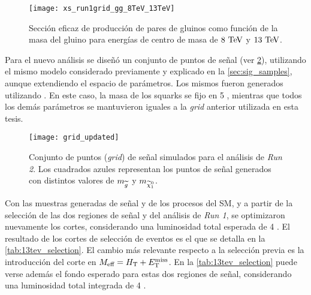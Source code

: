 \begin{figure}[!htb]
  \centering

  \texttt{[image: xs\_run1grid\_gg\_8TeV\_13TeV]}

  \caption{Sección eficaz de producción de pares de gluinos como función de la
    masa del gluino para energías de centro de masa de $8 \tev$ y
    $13 \tev$.}
  \label{fig:13tev_xs}

\end{figure}


Para el nuevo análisis se dise\~nó un conjunto de puntos de se\~nal (ver
\cref{fig:13tev_grid}), utilizando el mismo modelo considerado previamente y
explicado en la \cref{sec:sig_samples}, aunque extendiendo el espacio de
parámetros. Los mismos fueron generados utilizando
{\herwigpp}. En este caso, la masa de los squarks se fijo en 5 \tev, mientras
que todos los demás parámetros se mantuvieron iguales a la \emph{grid} anterior
utilizada en esta tesis.


\begin{figure}[!htb]
  \centering

  \texttt{[image: grid\_updated]}

  \caption{Conjunto de puntos (\emph{grid}) de señal simulados para el análisis
    de \emph{Run 2}. Los cuadrados azules representan los puntos de señal
    generados con distintos valores de $m_{\widetilde{g}}$ y $m_{\ninoone}$.}

  \label{fig:13tev_grid}

\end{figure}


Con las muestras generadas de señal y de los procesos del SM, y
a partir de la selección de las dos regiones de señal {\SRL} y {\SRH} del análisis de \emph{Run 1},
se optimizaron nuevamente los cortes, considerando una luminosidad total esperada de 4 \ifb.
El resultado de los cortes de selección de eventos es el que se detalla en la \cref{tab:13tev_selection}.
El cambio más relevante respecto a la selección previa es la introducción del corte en $M_\text{eff} = H_{\mathrm{T}} + E_{\mathrm{T}}^{\mathrm{miss}}$.
En la \cref{tab:13tev_selection} puede verse además el fondo esperado para
estas dos regiones de señal, considerando una luminosidad total integrada de 4 \ifb.

